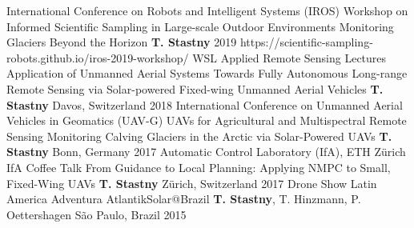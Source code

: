 \label{sec:talks}

\begin{cventries}

\cvtalkentry
	{International Conference on Robots and Intelligent Systems (IROS)} %
	{Workshop on Informed Scientific Sampling in Large-scale Outdoor Environments} %
	{Monitoring Glaciers Beyond the Horizon} %
	{\textbf{T. Stastny}} %
	{} %
	{2019} %
	{https://scientific-sampling-robots.github.io/iros-2019-workshop/} %
%
\cvtalkentry
	{WSL Applied Remote Sensing Lectures} %
	{Application of Unmanned Aerial Systems} %
	{Towards Fully Autonomous Long-range Remote Sensing via Solar-powered Fixed-wing Unmanned Aerial Vehicles} %
	{\textbf{T. Stastny}} %
	{Davos, Switzerland} %
	{2018} %
	{} %
%
\cvtalkentry
	{International Conference on Unmanned Aerial Vehicles in Geomatics (UAV-G)} %
	{UAVs for Agricultural and Multispectral Remote Sensing} %
	{Monitoring Calving Glaciers in the Arctic via Solar-Powered UAVs} %
	{\textbf{T. Stastny}} %
	{Bonn, Germany} %
	{2017} %
	{} %
%		
\cvtalkentry
	{Automatic Control Laboratory (IfA), ETH Z\"{u}rich} %
	{IfA Coffee Talk} %
	{From Guidance to Local Planning: Applying NMPC to Small, Fixed-Wing UAVs} %
	{\textbf{T. Stastny}} %
	{Z\"{u}rich, Switzerland} %
	{2017} %
	{} %
%
\cvtalkentry
	{Drone Show Latin America} %
	{} %
	{Adventura AtlantikSolar@Brazil} %
	{\textbf{T. Stastny}, T. Hinzmann, P. Oettershagen} %
	{S\~{a}o Paulo, Brazil} %
	{2015} %
	{} %
%
\end{cventries}
